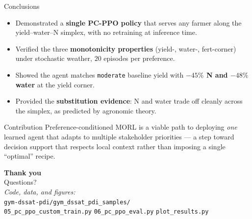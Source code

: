 \documentclass[10pt,aspectratio=169]{beamer}
\newcommand{\strong}[1]{\textbf{\textcolor{cAccent}{#1}}}
\begin{document}
\begin{frame}{Conclusions}
  \begin{itemize}
    \item Demonstrated a \strong{single PC-PPO policy} that serves any farmer along the
      yield--water--N simplex, with no retraining at inference time.
    \item Verified the three \strong{monotonicity properties} (yield-, water-, fert-corner)
      under stochastic weather, $20$ episodes per preference.
    \item Showed the agent matches \texttt{moderate} baseline yield with \strong{$-45\%$ N and $-48\%$ water}
      at the yield corner.
    \item Provided the \strong{substitution evidence}: N and water trade off cleanly
      across the simplex, as predicted by agronomic theory.
  \end{itemize}

  \vspace{1em}
  \begin{block}{Contribution}
    Preference-conditioned MORL is a viable path to deploying \emph{one} learned agent that
    adapts to multiple stakeholder priorities --- a step toward decision support
    that respects local context rather than imposing a single ``optimal'' recipe.
  \end{block}
\end{frame}

\begin{frame}[plain, c]{}
  \centering
  \vspace{1cm}
  {\Huge \textbf{Thank you}}\\[1em]
  {\Large Questions?}\\[2em]

  \small
  \textit{Code, data, and figures:}\\
  \texttt{gym-dssat-pdi/gym\_dssat\_pdi\_samples/}\\[0.5em]
  \texttt{05\_pc\_ppo\_custom\_train.py}\quad
  \texttt{06\_pc\_ppo\_eval.py}\quad
  \texttt{plot\_results.py}
\end{frame}
\end{document}
